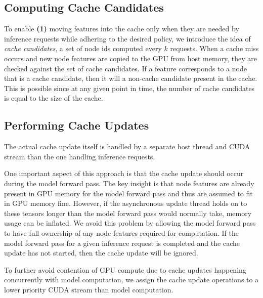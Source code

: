 
\subsection{Computing Cache Candidates}
To enable \textbf{(1)} moving features into the cache only when they are needed by inference requests while adhering to the desired policy, we introduce the idea of \textit{cache candidates}, a set of node ids computed every $k$ requests. When a cache miss occurs and new node features are copied to the GPU from host memory, they are checked against the set of cache candidates. If a feature corresponds to a node that is a cache candidate, then it will a non-cache candidate present in the cache. This is possible since at any given point in time, the number of cache candidates is equal to the size of the cache.

\subsection{Performing Cache Updates}
The actual cache update itself is handled by a separate host thread and CUDA stream than the one handling inference requests. 

One important aspect of this approach is that the cache update should occur during the model forward pass.
The key insight is that node features are already present in GPU memory for the model forward pass and thus are assumed to fit in GPU memory fine.
However, if the asynchronous update thread holds on to these tensors longer than the model forward pass would normally take, memory usage can be inflated. 
We avoid this problem by allowing the model forward pass to have full ownership of any node features required for computation.
If the model forward pass for a given inference request is completed and the cache update has not started, then the cache update will be ignored.

To further avoid contention of GPU compute due to cache updates happening concurrently with model computation, we assign the cache update operations to a lower priority CUDA stream than model computation.

